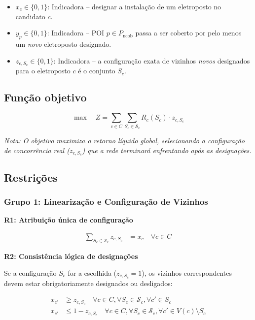\begin{itemize}
    \item $x_c \in \{0,1\}$: Indicadora -- designar a instalação de um eletroposto no candidato $c$.
    \item $y_p \in \{0,1\}$: Indicadora -- POI $p \in P_{\text{ncob}}$ passa a ser coberto por pelo menos um \textit{novo} eletroposto designado.
    \item $z_{c,S_c} \in \{0,1\}$: Indicadora -- a configuração exata de vizinhos \textit{novos} designados para o eletroposto $c$ é o conjunto $S_c$.
\end{itemize}

\subsection{Função objetivo}

\begin{equation}
\label{eq:objetivo_linear}
\max \quad Z = \sum_{c \in C} \sum_{S_c \in \mathcal{S}_c} R_c(S_c) \cdot z_{c,S_c}
\end{equation}

\textit{Nota: O objetivo maximiza o retorno líquido global, selecionando a configuração de concorrência real ($z_{c,S_c}$) que a rede terminará enfrentando após as designações.}

\subsection{Restrições}

\subsubsection{Grupo 1: Linearização e Configuração de Vizinhos}

\hspace{0.5cm} \textbf{R1: Atribuição única de configuração}

\begin{align}
\sum_{S_c \in \mathcal{S}_c} z_{c,S_c} &= x_c \quad \forall c \in C \label{eq:restricao_config}
\end{align}

\hspace{0.5cm} \textbf{R2: Consistência lógica de designações}

Se a configuração $S_c$ for a escolhida ($z_{c,S_c} = 1$), os vizinhos correspondentes devem estar obrigatoriamente designados ou desligados:

\begin{align}
x_{c'} &\geq z_{c,S_c} \quad \forall c \in C, \forall S_c \in \mathcal{S}_c, \forall c' \in S_c \label{eq:restricao_consistencia_in} \\
x_{c'} &\leq 1 - z_{c,S_c} \quad \forall c \in C, \forall S_c \in \mathcal{S}_c, \forall c' \in V(c) \setminus S_c \label{eq:restricao_consistencia_out}
\end{align}

